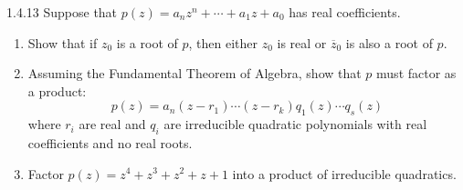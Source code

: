 \documentclass[12pt]{article}
\begin{document}
\begin{problem}{1.4.13}
    Suppose that $p(z) = a_nz^n + \cdots + a_1z + a_0$ has real coefficients. 
    \begin{enumerate}
        \item Show that if $z_0$ is a root of $p$, then either $z_0$ is real or $\overline{z}_0$ is also a root of $p$. 
        \item Assuming the Fundamental Theorem of Algebra, show that $p$ must factor as a product: 
        \[ p(z) = a_n(z-r_1)\cdots(z-r_k)q_1(z)\cdots q_s(z)\]
        where $r_i$ are real and $q_i$ are irreducible quadratic polynomials with real coefficients and no real roots. 
        \item Factor $p(z) = z^4 + z^3 + z^2 + z + 1$ into a product of irreducible quadratics. 
    \end{enumerate}
\end{problem}
\end{document}
